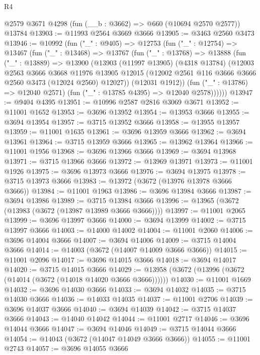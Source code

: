 \begin{lexlean}{R4}
\begin{coremodule}
    @2579
    @3671
    @4298
    (fun (__b : @3662) => @660 (@10694 @2570 @2577))
    @13784
@13903 := @11993 @2564 @3669 @3666
@13905 := @3463 @2560 @3473
@13946 := @10992
    (fun ("_" : @9405) =>
    @12753
      (fun ("_" : @12754) =>
      @13467
        (fun ("_" : @13468) =>
        @13767
          (fun ("_" : @13768) =>
          @13888
            (fun ("_" : @13889) =>
            @13900
              (@13903
                (@11997 @13905)
                (@4318 @13784)
                (@12003
                  @2563
                  @3666
                  @3668
                  @11976
                  @13905
                  @12015
                  (@12002 @2561 @116 @3666 @3666 @2560 @3473 (@12024 @2560) @12027))
                (@12031 @1912))
              (fun ("_" : @13786) => @12040 @2571)
              (fun ("_" : @13785 @4395) => @12040 @2578))))))
@13947 := @9404 @4395
@13951 := @10996 @2587 @2816 @3069 @3671
@13952 := @11001 @1652
@13953 := @3696 @13952
@13954 := @13953 @3666
@13955 := @3694 @13954
@13957 := @3715 @13952 @3666
@13958 := @13955 @13957
@13959 := @11001 @1635
@13961 := @3696 @13959 @3666
@13962 := @3694 @13961
@13964 := @3715 @13959 @3666
@13965 := @13962 @13964
@13966 := @11001 @1956
@13968 := @3696 @13966 @3666
@13969 := @3694 @13968
@13971 := @3715 @13966 @3666
@13972 := @13969 @13971
@13973 := @11001 @1926
@13975 := @3696 @13973 @3666
@13976 := @3694 @13975
@13978 := @3715 @13973 @3666
@13983 := @13972 (@3672 (@13976 @13978 @3666 @3666))
@13984 := @11001 @1963
@13986 := @3696 @13984 @3666
@13987 := @3694 @13986
@13989 := @3715 @13984 @3666
@13996 := @13965 (@3672 (@13983 (@3672 (@13987 @13989 @3666 @3666))))
@13997 := @11001 @2065
@13999 := @3696 @13997 @3666
@14000 := @3694 @13999
@14002 := @3715 @13997 @3666
@14003 := @14000 @14002
@14004 := @11001 @2060
@14006 := @3696 @14004 @3666
@14007 := @3694 @14006
@14009 := @3715 @14004 @3666
@14014 := @14003 (@3672 (@14007 @14009 @3666 @3666))
@14015 := @11001 @2096
@14017 := @3696 @14015 @3666
@14018 := @3694 @14017
@14020 := @3715 @14015 @3666
@14029 := @13958 (@3672 (@13996 (@3672 (@14014 (@3672 (@14018 @14020 @3666 @3666))))))
@14030 := @11001 @1669
@14032 := @3696 @14030 @3666
@14033 := @3694 @14032
@14035 := @3715 @14030 @3666
@14036 := @14033 @14035
@14037 := @11001 @2706
@14039 := @3696 @14037 @3666
@14040 := @3694 @14039
@14042 := @3715 @14037 @3666
@14043 := @14040 @14042
@14044 := @11001 @2717
@14046 := @3696 @14044 @3666
@14047 := @3694 @14046
@14049 := @3715 @14044 @3666
@14054 := @14043 (@3672 (@14047 @14049 @3666 @3666))
@14055 := @11001 @2743
@14057 := @3696 @14055 @3666

\end{coremodule}
\end{lexlean}
